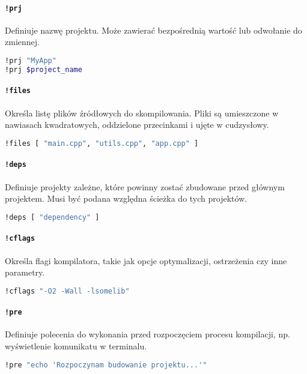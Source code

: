 \paragraph{\texttt{!prj}} Definiuje nazwę projektu. Może zawierać bezpośrednią wartość lub odwołanie do zmiennej.
\begin{lstlisting}[language=sh,alsoletter={!},keywords={!let,!prj,!files,!deps,!cflags,!pre,!post,!inc}]
!prj "MyApp"
!prj $project_name
\end{lstlisting}

\paragraph{\texttt{!files}} Określa listę plików źródłowych do skompilowania. Pliki są umieszczone w nawiasach kwadratowych, oddzielone przecinkami i ujęte w cudzysłowy.
\begin{lstlisting}[language=sh,alsoletter={!},keywords={!let,!prj,!files,!deps,!cflags,!pre,!post,!inc}]
!files [ "main.cpp", "utils.cpp", "app.cpp" ]
\end{lstlisting}

\paragraph{\texttt{!deps}} Definiuje projekty zależne, które powinny zostać zbudowane przed głównym projektem. Musi być podana względna ścieżka do tych projektów.
\begin{lstlisting}[language=sh,alsoletter={!},keywords={!let,!prj,!files,!deps,!cflags,!pre,!post,!inc}]
!deps [ "dependency" ]
\end{lstlisting}

\paragraph{\texttt{!cflags}} Określa flagi kompilatora, takie jak opcje optymalizacji, ostrzeżenia czy inne parametry.
\begin{lstlisting}[language=sh,alsoletter={!},keywords={!let,!prj,!files,!deps,!cflags,!pre,!post,!inc}]
!cflags "-O2 -Wall -lsomelib"
\end{lstlisting}

\paragraph{\texttt{!pre}} Definiuje polecenia do wykonania przed rozpoczęciem procesu kompilacji, np. wyświetlenie komunikatu w terminalu.
\begin{lstlisting}[language=sh,alsoletter={!},keywords={!let,!prj,!files,!deps,!cflags,!pre,!post,!inc}]
!pre "echo 'Rozpoczynam budowanie projektu...'"
\end{lstlisting}

